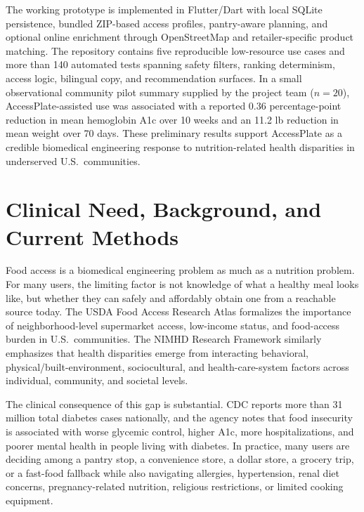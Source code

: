 \documentclass[11pt,letterpaper]{article}
\begin{document}
The working prototype is implemented in Flutter/Dart with local SQLite persistence, bundled ZIP-based access profiles, pantry-aware planning, and optional online enrichment through OpenStreetMap and retailer-specific product matching. The repository contains five reproducible low-resource use cases and more than 140 automated tests spanning safety filters, ranking determinism, access logic, bilingual copy, and recommendation surfaces. In a small observational community pilot summary supplied by the project team (\(n=20\)), AccessPlate-assisted use was associated with a reported \num{0.36} percentage-point reduction in mean hemoglobin A1c over 10 weeks and an \num{11.2} lb reduction in mean weight over 70 days.\cite{accessplate_pilot_2026} These preliminary results support AccessPlate as a credible biomedical engineering response to nutrition-related health disparities in underserved U.S.\ communities.

\section{Clinical Need, Background, and Current Methods}
Food access is a biomedical engineering problem as much as a nutrition problem. For many users, the limiting factor is not knowledge of what a healthy meal looks like, but whether they can safely and affordably obtain one from a reachable source today. The USDA Food Access Research Atlas formalizes the importance of neighborhood-level supermarket access, low-income status, and food-access burden in U.S.\ communities.\cite{usda_food_access_atlas} The NIMHD Research Framework similarly emphasizes that health disparities emerge from interacting behavioral, physical/built-environment, sociocultural, and health-care-system factors across individual, community, and societal levels.\cite{nimhd_framework}

The clinical consequence of this gap is substantial. CDC reports more than 31 million total diabetes cases nationally,\cite{cdc_national_diabetes_profile} and the agency notes that food insecurity is associated with worse glycemic control, higher A1c, more hospitalizations, and poorer mental health in people living with diabetes.\cite{cdc_food_insecurity_diabetes} In practice, many users are deciding among a pantry stop, a convenience store, a dollar store, a grocery trip, or a fast-food fallback while also navigating allergies, hypertension, renal diet concerns, pregnancy-related nutrition, religious restrictions, or limited cooking equipment.
\end{document}
